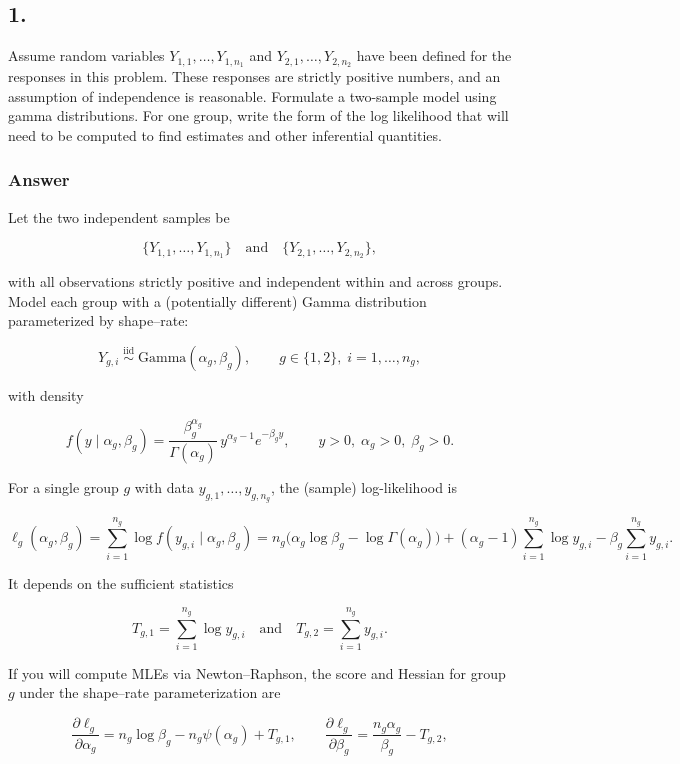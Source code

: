 \documentclass[
]{article}
\begin{document}
\newpage

\subsection{1.}\label{section}

Assume random variables \(Y_{1,1}, \ldots, Y_{1,n_1}\) and
\(Y_{2,1}, \ldots, Y_{2,n_2}\) have been defined for the responses in
this problem. These responses are strictly positive numbers, and an
assumption of independence is reasonable. Formulate a two-sample model
using gamma distributions. For one group, write the form of the log
likelihood that will need to be computed to find estimates and other
inferential quantities.

\subsubsection{Answer}\label{answer}

Let the two independent samples be

\[
\{Y_{1,1},\dots,Y_{1,n_1}\}\quad\text{and}\quad\{Y_{2,1},\dots,Y_{2,n_2}\},
\]

with all observations strictly positive and independent within and
across groups. Model each group with a (potentially different) Gamma
distribution parameterized by shape--rate:

\[
Y_{g,i}\;\stackrel{\text{iid}}{\sim}\;\mathrm{Gamma}(\alpha_g,\beta_g), \qquad g\in\{1,2\},\; i=1,\dots,n_g,
\]

with density

\[
f(y\mid \alpha_g,\beta_g)=\frac{\beta_g^{\alpha_g}}{\Gamma(\alpha_g)}\,y^{\alpha_g-1}e^{-\beta_g y},\qquad y>0,\;\alpha_g>0,\;\beta_g>0.
\]

For a single group \(g\) with data \(y_{g,1},\dots,y_{g,n_g}\), the
(sample) log-likelihood is

\[
\ell_g(\alpha_g,\beta_g)
=\sum_{i=1}^{n_g}\log f(y_{g,i}\mid \alpha_g,\beta_g)
= n_g\Big(\alpha_g\log\beta_g-\log\Gamma(\alpha_g)\Big)
+(\alpha_g-1)\sum_{i=1}^{n_g}\log y_{g,i}
-\beta_g\sum_{i=1}^{n_g} y_{g,i}.
\]

It depends on the sufficient statistics

\[
T_{g,1}=\sum_{i=1}^{n_g}\log y_{g,i}
\quad\text{and}\quad
T_{g,2}=\sum_{i=1}^{n_g} y_{g,i}.
\]

If you will compute MLEs via Newton--Raphson, the score and Hessian for
group \(g\) under the shape--rate parameterization are

\[
\frac{\partial \ell_g}{\partial \alpha_g}
= n_g\log \beta_g - n_g\psi(\alpha_g) + T_{g,1}, 
\qquad
\frac{\partial \ell_g}{\partial \beta_g}
= \frac{n_g\alpha_g}{\beta_g} - T_{g,2},
\]
\end{document}
